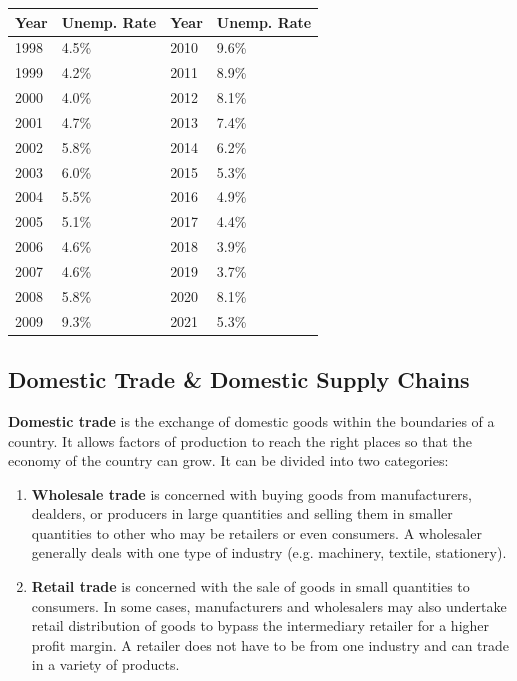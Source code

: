 \documentclass{article}
\begin{document}
  \begin{table}[H]
    \begin{tabular}{llll}
    \hline
    Year & Unemp. Rate & Year & Unemp. Rate \\
    \hline
    1998 & 4.5\% & 2010 & 9.6\% \\
    1999 & 4.2\% & 2011 & 8.9\% \\
    2000 & 4.0\% & 2012 & 8.1\% \\
    2001 & 4.7\% & 2013 & 7.4\% \\
    2002 & 5.8\% & 2014 & 6.2\% \\
    2003 & 6.0\% & 2015 & 5.3\% \\
    2004 & 5.5\% & 2016 & 4.9\% \\
    2005 & 5.1\% & 2017 & 4.4\% \\
    2006 & 4.6\% & 2018 & 3.9\% \\
    2007 & 4.6\% & 2019 & 3.7\% \\
    2008 & 5.8\% & 2020 & 8.1\% \\
    2009 & 9.3\% & 2021 & 5.3\% \\
    \hline
    \end{tabular}
  \end{table}

  \subsection{Domestic Trade \& Domestic Supply Chains}

    \textbf{Domestic trade} is the exchange of domestic goods within the boundaries of a country. It allows factors of production to reach the right places so that the economy of the country can grow. It can be divided into two categories:

    \begin{enumerate}
      \item \textbf{Wholesale trade} is concerned with buying goods from manufacturers, dealders, or producers in large quantities and selling them in smaller quantities to other who may be retailers or even consumers. A wholesaler generally deals with one type of industry (e.g. machinery, textile, stationery).
      \item \textbf{Retail trade} is concerned with the sale of goods in small quantities to consumers. In some cases, manufacturers and wholesalers may also undertake retail distribution of goods to bypass the intermediary retailer for a higher profit margin. A retailer does not have to be from one industry and can trade in a variety of products.
    \end{enumerate}
\end{document}
